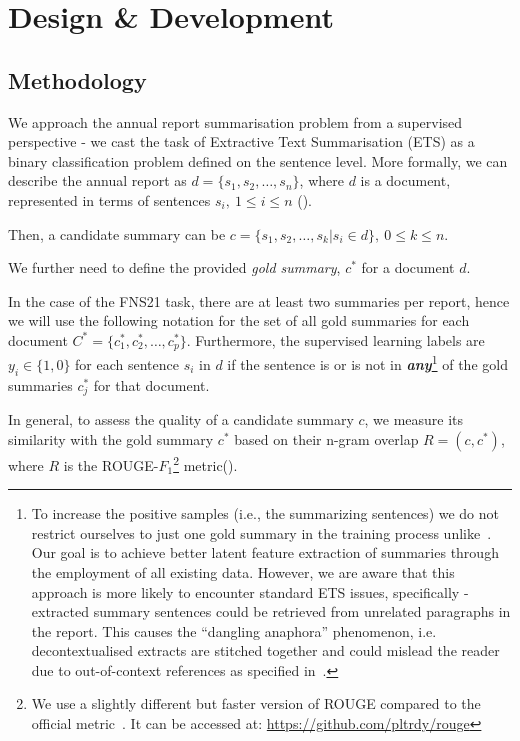 \section{Design \& Development}\label{sec:design-and-development}

\subsection{Methodology}\label{subsec:methodology}
We approach the annual report summarisation problem from a supervised perspective - we cast the task of Extractive Text Summarisation (ETS) as a binary classification problem defined on the sentence level.
More formally, we can describe the annual report as $d=\{s_{1}, s_{2}, \dots, s_{n}\}$, where $d$ is a document, represented in terms of sentences $s_{i}, \  1 \leq i \leq n$ (\cite{liu2019finetuningbert}).

Then, a candidate summary can be $c=\{s_{1}, s_{2}, \dots, s_{k} | s_{i} \in d \}, \ 0 \leq k \leq n$.

We further need to define the provided \emph{gold summary}, $c^{*}$ for a document $d$.

In the case of the FNS21 task, there are at least two summaries per report, hence we will use the following notation for the set of all gold summaries for each document $C^{*} = \{c^{*}_{1}, c^{*}_{2}, \dots, c^{*}_{p}\}$.
Furthermore, the supervised learning labels are $y_{i} \in \{1,0\}$ for each sentence $s_{i}$ in $d$ if the sentence is or is not in \textbf{\emph{any}}\footnote{
    To increase the positive samples (i.e., the summarizing sentences) we do not restrict ourselves to just one gold summary in the training process unlike~\cite{orzhenovskii-2021-t5}.
    Our goal is to achieve better latent feature extraction of summaries through the employment of all existing data.
    However, we are aware that this approach is more likely to encounter standard ETS issues, specifically - extracted summary sentences could be retrieved from unrelated paragraphs in the report.
    This causes the \enquote{dangling anaphora} phenomenon, i.e. decontextualised extracts are stitched together and could mislead the reader due to out-of-context references as specified in~\cite{lin2009summarization}.
} of the gold summaries $c^{*}_{j}$ for that document.

In general, to assess the quality of a candidate summary $c$, we measure its similarity with the gold summary $c^{*}$ based on their n-gram overlap $R=(c, c^{*})$, where $R$ is the ROUGE-$F_{1}$\footnote{
    We use a slightly different but faster version of ROUGE compared to the official metric~\cite{lin2004rouge}.
    It can be accessed at: \url{https://github.com/pltrdy/rouge}
    } metric(\cite{lin2004rouge}).

